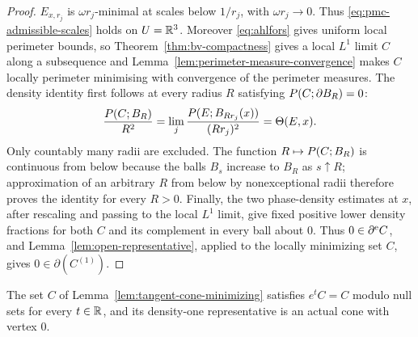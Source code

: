 \begin{proof}
$E_{x,r_j}$ is $\omega r_j$-minimal at scales below $1/r_j$, with
$\omega r_j\to0$.  Thus \eqref{eq:pmc-admissible-scales} holds on
$U=\mathbb R^3$.  Moreover
\eqref{eq:ahlfors} gives uniform local perimeter bounds, so
Theorem~\ref{thm:bv-compactness} gives a local $L^1$ limit $C$ along a
subsequence and Lemma~\ref{lem:perimeter-measure-convergence} makes $C$
locally perimeter minimising with convergence of the perimeter measures.  The
density identity first follows at every radius $R$ satisfying
$P(C;\partial B_R)=0$:
\[
  \frac{P(C;B_R)}{R^2}
  =\lim_j\frac{P(E;B_{Rr_j}(x))}{(Rr_j)^2}=\Theta(E,x).
\]
Only countably many radii are excluded.  The function
$R\mapsto P(C;B_R)$ is continuous from below because the balls $B_s$
increase to $B_R$ as $s\uparrow R$; approximation of an arbitrary $R$ from
below by nonexceptional radii therefore proves the identity for every $R>0$.
Finally, the two phase-density estimates at $x$, after rescaling and passing
to the local $L^1$ limit, give fixed positive lower density fractions for
both $C$ and its complement in every ball about $0$.  Thus $0\in\partial^{\mathrm e} C$, and
Lemma~\ref{lem:open-representative}, applied to the locally minimizing set
$C$, gives $0\in\partial(C^{(1)})$.
\end{proof}

\begin{proposition}\label{prop:tangent-is-cone}
The set $C$ of Lemma~\ref{lem:tangent-cone-minimizing} satisfies $e^tC=C$
modulo null sets for every $t\in\mathbb R$, and its density-one representative is an
actual cone with vertex $0$.
\end{proposition}


